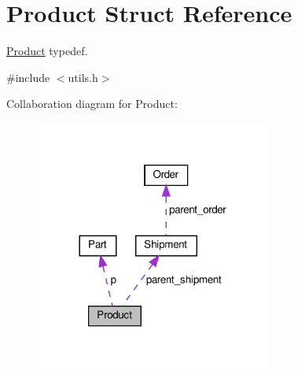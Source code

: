\hypertarget{structProduct}{}\section{Product Struct Reference}
\label{structProduct}


\hyperlink{structProduct}{Product} typedef.  




{\ttfamily \#include $<$utils.\+h$>$}



Collaboration diagram for Product\+:
\nopagebreak
\begin{figure}[H]
\begin{center}
\leavevmode
\includegraphics[width=221pt]{structProduct__coll__graph}
\end{center}
\end{figure}
